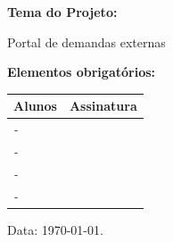 \documentclass[
	hidelinks,
	12pt,				%
	openright,			%
	oneside,			%
	a4paper,			%
	english,			%
	french,				%
	spanish,			%
	brazil,				%
]{abntex2}
\newcommand{\imprimirautorA}{\oautorA}
\newcommand{\imprimirprontuarioA}{\oprontuarioA}
\newcommand{\imprimirautorB}{\oautorB}
\newcommand{\imprimirprontuarioB}{\oprontuarioB}
\newcommand{\imprimirautorC}{\oautorC}
\newcommand{\imprimirprontuarioC}{\oprontuarioC}
\newcommand{\imprimirautorD}{\oautorD}
\newcommand{\imprimirprontuarioD}{\oprontuarioD}
\begin{document}
\begin{flushleft}
   \small \textbf{Tema do Projeto:}
\end{flushleft} 
\normalsize
Portal de demandas externas\\


\begin{flushleft}
\textbf{Elementos obrigatórios: }
\end{flushleft} 


\vspace{1cm}

\begin{center}
	\begin{tabular}{|m{10cm}|m{5cm}|}
		\hline
		\textbf{Alunos} & \textbf{Assinatura} \\
		\hline
		 \textit{\imprimirprontuarioA - \imprimirautorA} &  \\
		\hline
		\textit{\imprimirprontuarioB - \imprimirautorB} &  \\
		\hline
		\textit{\imprimirprontuarioC - \imprimirautorC} & \\
		\hline
         \textit{\imprimirprontuarioD - \imprimirautorD} & \\
		\hline
	\end{tabular}
\end{center}

\begin{flushright}
   Data: \today.
\end{flushright}
\end{document}
